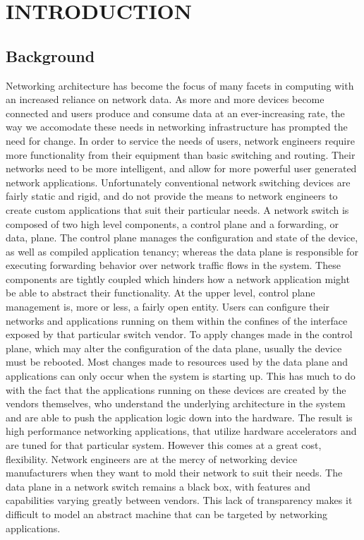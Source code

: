 \chapter{INTRODUCTION}
\label{intro}


\section{Background}
\label{intro:bg}
Networking architecture has become the focus of many facets in computing with
an increased reliance on network data. As more and more devices become
connected and users produce and consume data at an ever-increasing rate, the
way we accomodate these needs in networking infrastructure has prompted the
need for change. In order to service the needs of users, network engineers
require more functionality from their equipment than basic switching and
routing. Their networks need to be more intelligent, and allow for more
powerful user generated network applications. Unfortunately conventional
network switching devices are fairly static and rigid, and do not provide the
means to network engineers to create custom applications that suit their
particular needs. A network switch is composed of two high level components, a
control plane and a forwarding, or data, plane. The control plane manages the
configuration and state of the device, as well as compiled application
tenancy; whereas the data plane is responsible for executing forwarding
behavior over network traffic flows in the system. These components are
tightly coupled which hinders how a network application might be able to
abstract their functionality. At the upper level, control plane management is,
more or less, a fairly open entity. Users can configure their networks and
applications running on them within the confines of the interface exposed by
that particular switch vendor. To apply changes made in the control plane,
which may alter the configuration of the data plane, usually the device must
be rebooted. Most changes made to resources used by the data plane and
applications can only occur when the system is starting up. This has much to
do with the fact that the applications running on these devices are created by
the vendors themselves, who understand the underlying architecture in the
system and are able to push the application logic down into the hardware. The
result is high performance networking applications, that utilize hardware
accelerators and are tuned for that particular system. However this comes at a
great cost, flexibility. Network engineers are at the mercy of networking
device manufacturers when they want to mold their network to suit their needs.
The data plane in a network switch remains a black box, with features and
capabilities varying greatly between vendors. This lack of transparency makes
it difficult to model an abstract machine that can be targeted by networking
applications.

